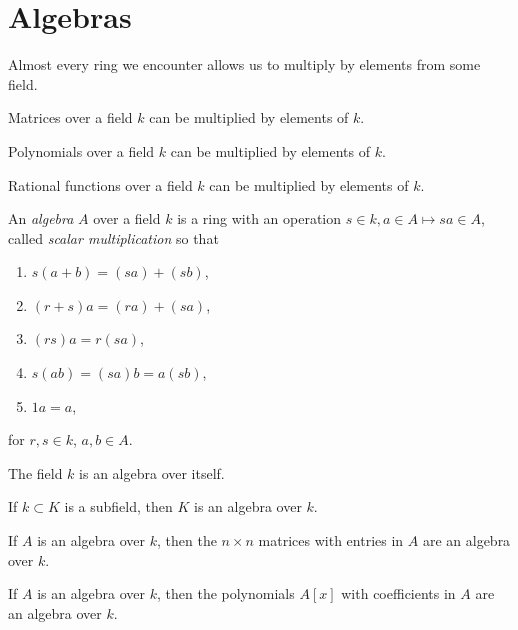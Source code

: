 \section{Algebras}
Almost every ring we encounter allows us to multiply by elements from some field.
\begin{example}
Matrices over a field \(k\) can be multiplied by elements of \(k\).
\end{example}
\begin{example}
Polynomials over a field \(k\) can be multiplied by elements of \(k\).
\end{example}
\begin{example}
Rational functions over a field \(k\) can be multiplied by elements of \(k\).
\end{example}
An \emph{algebra} \(A\) over a field \(k\) is a ring with an operation \(s \in k, a \in A \mapsto sa \in A\), called \emph{scalar multiplication} so that
\begin{enumerate}
\item \(s(a+b)=(sa)+(sb)\), 
\item \((r+s)a=(ra)+(sa)\), 
\item \((rs)a=r(sa)\), 
\item \(s(ab)=(sa)b=a(sb)\),
\item \(1a=a\),
\end{enumerate}
for \(r,s \in k\), \(a, b \in A\).

\begin{example}
The field \(k\) is an algebra over itself.
\end{example}
\begin{example}
If \(k \subset K\) is a subfield, then \(K\) is an algebra over \(k\).
\end{example}
\begin{example}
If \(A\) is an algebra over \(k\), then the \(n \times n\) matrices with entries in \(A\) are an algebra over \(k\).
\end{example}
\begin{example}
If \(A\) is an algebra over \(k\), then the polynomials \(A[x]\) with coefficients in \(A\) are an algebra over \(k\).
\end{example}

